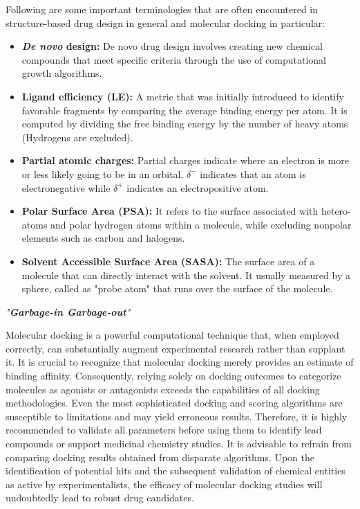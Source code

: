 Following are some important terminologies that are often encountered in structure-based drug design in general and molecular docking in particular: 
\begin{itemize}
    \item \textbf{\textit{De novo} design:} De novo drug design involves creating new chemical compounds that meet specific criteria through the use of computational growth algorithms. 
    \item \textbf{Ligand efficiency (LE):} A metric that was initially introduced to identify favorable fragments by comparing the average binding energy per atom. It is computed by dividing the free binding energy by the number of heavy atoms (Hydrogens are excluded).
    \item \textbf{Partial atomic charges:} Partial charges indicate where an electron is more or less likely going to be in an orbital. $ \delta^-$ indicates that an atom is electronegative while $ \delta^+$ indicates an electropositive atom. 
    \item \textbf{Polar Surface Area (PSA):} It refers to the surface associated with hetero-atoms and polar hydrogen atoms within a molecule, while excluding nonpolar elements such as carbon and halogens. 
    \item \textbf{Solvent Accessible Surface Area (SASA):} The surface area of a molecule that can directly interact with the solvent. It usually measured by a sphere, called as "probe atom" that runs over the surface of the molecule. 
\end{itemize}

%
\textit{"\textbf{Garbage-in Garbage-out}"}

Molecular docking is a powerful computational technique that, when employed correctly, can substantially augment experimental research rather than supplant it. It is crucial to recognize that molecular docking merely provides an estimate of binding affinity. Consequently, relying solely on docking outcomes to categorize molecules as agonists or antagonists exceeds the capabilities of all docking methodologies. Even the most sophisticated docking and scoring algorithms are susceptible to limitations and may yield erroneous results. Therefore, it is highly recommended to validate all parameters before using them to identify lead compounds or support medicinal chemistry studies. It is advisable to refrain from comparing docking results obtained from disparate algorithms. Upon the identification of potential hits and the subsequent validation of chemical entities as active by experimentalists, the efficacy of molecular docking studies will undoubtedly lead to robust drug candidates. 


%

%

